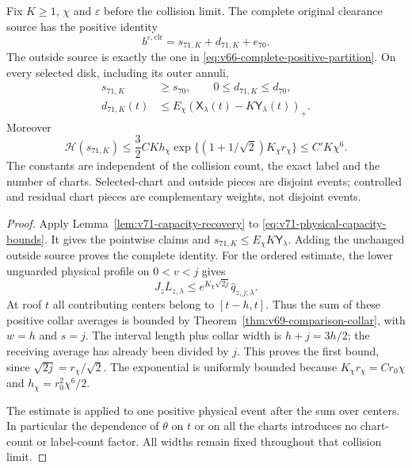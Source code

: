 \begin{theorem}
\label{thm:v71-pooled-height}
Fix $K\ge1$, $\chi$ and $\varepsilon$ before the collision limit.
The complete original clearance source has the positive identity
\begin{equation}\label{eq:v71-complete-source}
 b^{\varepsilon,\mathrm{clr}}=s_{71,K}+d_{71,K}+e_{70}.
\end{equation}
The outside source is exactly the one in
\eqref{eq:v66-complete-positive-partition}. On every selected disk,
including its outer annuli,
\begin{align}
 s_{71,K}&\ge s_{70},\qquad 0\le d_{71,K}\le d_{70},
                                      \label{eq:v71-monotone-recovery}\\
 d_{71,K}(t)&\le E_\chi
              (\mathsf X_\lambda(t)-K\mathsf Y_\lambda(t))_+.
                                      \label{eq:v71-pooled-deficit}
\end{align}
Moreover
\begin{equation}\label{eq:v71-pooled-height}
 \mathcal H(s_{71,K})
 \le \frac32 CK h_\chi
          \exp\{(1+1/\sqrt2)K_\chi r_\chi\}
 \le C'K\chi^6.
\end{equation}
The constants are independent of the collision count, the exact label
and the number of charts. Selected-chart and outside pieces are
disjoint events; controlled and residual chart pieces are
complementary weights, not disjoint events.
\end{theorem}
\begin{proof}
Apply Lemma~\ref{lem:v71-capacity-recovery} to
\eqref{eq:v71-physical-capacity-bounds}. It gives the pointwise
claims and $s_{71,K}\le E_\chi K\mathsf Y_\lambda$.
Adding the unchanged outside source proves the complete identity.
For the ordered estimate, the lower unguarded physical profile on
$0<v<j$ gives
\[
 J_z\overline L_{z,\lambda}
       \le e^{K_\chi\sqrt{2j}}\widehat q_{z,j;\lambda}.
\]
At roof $t$ all contributing centers belong to $[t-h,t]$.
Thus the sum of these positive collar averages is bounded by
Theorem~\ref{thm:v69-comparison-collar}, with $w=h$ and $s=j$.
The interval length plus collar width is $h+j=3h/2$; the receiving
average has already been divided by $j$. This proves the first
bound, since $\sqrt{2j}=r_\chi/\sqrt2$. The exponential is
uniformly bounded because $K_\chi r_\chi=Cr_0\chi$ and
$h_\chi=r_0^2\chi^6/2$.

The estimate is applied to one positive physical event after the
sum over centers. In particular the dependence of $\theta$ on $t$
or on all the charts introduces no chart-count or label-count factor.
All widths remain fixed throughout that collision limit.
\end{proof}

